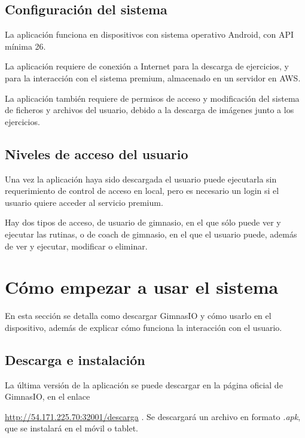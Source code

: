 \documentclass[11pt,a4paper]{report}
\begin{document}
\subsection{Configuración del sistema}
La aplicación funciona en dispositivos con sistema operativo Android, con API mínima 26.

La aplicación requiere de conexión a Internet para la descarga de ejercicios, y para la interacción con el sistema premium, almacenado en un servidor en AWS.

La aplicación también requiere de permisos de acceso y modificación del sistema de ficheros y archivos del usuario, debido a la descarga de imágenes junto a los ejercicios.

\subsection{Niveles de acceso del usuario}
Una vez la aplicación haya sido descargada el usuario puede ejecutarla sin requerimiento de control de acceso en local, pero es necesario un login si el usuario quiere acceder al servicio premium. 

Hay dos tipos de acceso, de usuario de gimnasio, en el que sólo puede ver y ejecutar las rutinas, o de coach de gimnasio, en el que el usuario puede, además de ver y ejecutar, modificar o eliminar.

\section{Cómo empezar a usar el sistema}
En esta sección se detalla como descargar GimnasIO y cómo usarlo en el dispositivo, además de explicar cómo funciona la interacción con el usuario.

\subsection{Descarga e instalación}
La última versión de la aplicación se puede descargar en la página oficial de GimnasIO, en el enlace 

\url{http://54.171.225.70:32001/descarga} . Se descargará un archivo en formato \textit{.apk}, que se instalará en el móvil o tablet.
\end{document}
